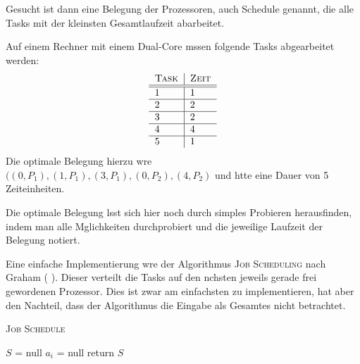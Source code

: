 \documentclass[12pt, a4paper, twoside]{scrartcl}
\begin{document}
Gesucht ist dann eine Belegung der Prozessoren, auch Schedule genannt, die alle Tasks mit der kleinsten Gesamtlaufzeit abarbeitet.\\

\begin{example}
	[Prozessorbelegung]\label{prozessorbelegung} 
	Auf einem Rechner mit einem Dual-Core mssen folgende Tasks abgearbeitet werden:\\
	\begin{align}
		\begin{tabular}
			{l|l} \textsc{Task}&\textsc{Zeit}\\
			\hline \hline 1 & 1\\
			\hline 2 & 2\\
			\hline 3 & 2\\
			\hline 4 & 4\\
			\hline 5 & 1\\
		\end{tabular}
	\end{align}
	Die optimale Belegung hierzu wre $((0,P_1),(1,P_1),(3,P_1),(0,P_2),(4,P_2)$  und htte eine Dauer von 5 Zeiteinheiten.
\end{example}

Die optimale Belegung lsst sich hier noch durch simples Probieren herausfinden, indem man alle Mglichkeiten durchprobiert und die jeweilige Laufzeit der Belegung notiert.

Eine einfache Implementierung wre der Algorithmus \textsc{Job Scheduling} nach Graham (\cite{gra66} ). Dieser verteilt die Tasks auf den nchsten jeweils gerade frei gewordenen Prozessor. Dies ist zwar am einfachsten zu implementieren, hat aber den Nachteil, dass der Algorithmus die Eingabe als Gesamtes nicht betrachtet.

\label{fig:js}
\begin{algorithm}[h]
\caption{\textsc{Job Schedule}}
$S$ = null \;
	{$a_i$ = null\;}
return $S$\;
\end{algorithm}
\end{document}
